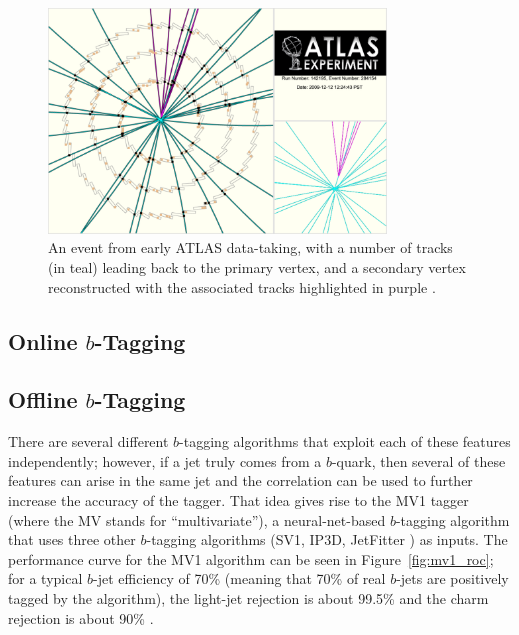 \begin{figure}
	\includegraphics[width=0.8\textwidth]{ReconstructionPerformance/images/secondary_vertex.pdf}
	\caption{An event from early ATLAS data-taking, with a number of tracks (in teal) leading back to the primary vertex, and a secondary vertex reconstructed with the associated tracks highlighted in purple \cite{sv}.	\label{fig:secondary_vertex}  }
\end{figure}



\subsection{Online $b$-Tagging}




\subsection{Offline $b$-Tagging}
There are several different $b$-tagging algorithms that exploit each of these features independently; however, if 
a jet truly comes from a $b$-quark, then several of these features can arise in the 
same jet and the correlation can be used to further increase the accuracy of the tagger.  That idea gives 
rise to the MV1 tagger (where the MV stands for ``multivariate''), a neural-net-based 
$b$-tagging algorithm that uses three other $b$-tagging algorithms (SV1, IP3D, JetFitter
) as inputs.   The performance curve for the MV1 algorithm can be seen in Figure~\ref{fig:mv1_roc}; 
for a typical $b$-jet efficiency of 70\% (meaning that 70\% of real $b$-jets 
are positively tagged by the algorithm), the light-jet rejection is about 99.5\% and the 
charm rejection is about 90\% \cite{b-tagging}.


